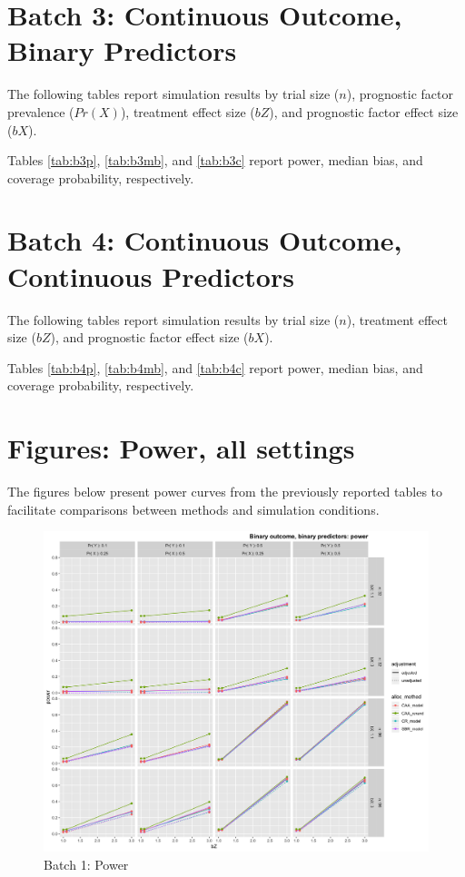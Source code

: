\section[Continuous Y, binary X]{Batch 3: Continuous Outcome, Binary Predictors}

The following tables report simulation results by trial size ($n$), prognostic factor prevalence ($Pr( X )$), treatment effect size ($bZ$), and prognostic factor effect size ($bX$).

Tables \ref{tab:b3p}, \ref{tab:b3mb}, and \ref{tab:b3c} report power, median bias, and coverage probability, respectively.

 \newpage 
 \newpage
 \newpage

\section[Continuous Y, continuous X]{Batch 4: Continuous Outcome, Continuous Predictors}

The following tables report simulation results by trial size ($n$), treatment effect size ($bZ$), and prognostic factor effect size ($bX$).

Tables \ref{tab:b4p}, \ref{tab:b4mb}, and \ref{tab:b4c} report power, median bias, and coverage probability, respectively.

 \newpage 
 \newpage 
 \newpage

\section{Figures: Power, all settings}
The figures below present power curves from the previously reported tables to facilitate comparisons between methods and simulation conditions.

\begin{figure}[H]
	\includegraphics[width=\linewidth]{figures/b1_power_all_methods_adj_unadj}
	\caption{Batch 1: Power}
	\label{fig:b1p}
\end{figure}

